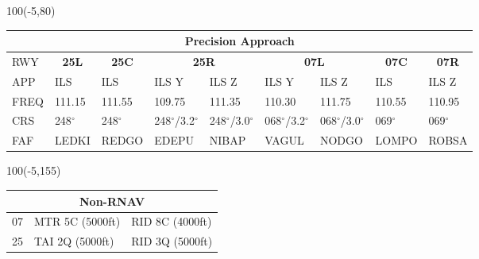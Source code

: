 \documentclass[10pt,landscape,a4paper]{article}
\begin{document}
\begin{textblock}{100}(-5,80)
\begin{table}[]
\begin{tabular}{|l|l|l|l|l|l|l|l|l|}
\multicolumn{9}{c}{\textbf{Precision Approach}}                                                                                                                                                                            \\ \hline
RWY  & \multicolumn{1}{c|}{\textbf{25L}} & \multicolumn{1}{c|}{\textbf{25C}} & \multicolumn{2}{c|}{\textbf{25R}} & \multicolumn{2}{c|}{\textbf{07L}} & \multicolumn{1}{c|}{\textbf{07C}} & \multicolumn{1}{c|}{\textbf{07R}} \\ \hline
APP  & ILS                               & ILS                               & ILS Y           & ILS Z           & ILS Y           & ILS Z           & ILS                               & ILS Z                             \\
FREQ & 111.15                            & 111.55                            & 109.75          & 111.35          & 110.30          & 111.75          & 110.55                            & 110.95                            \\
CRS  & 248$^\circ$                              & 248$^\circ$                              & 248$^\circ$/3.2$^\circ$       & 248$^\circ$/3.0$^\circ$       & 068$^\circ$/3.2$^\circ$       & 068$^\circ$/3.0$^\circ$       & 069$^\circ$                              & 069$^\circ$                              \\
FAF  & LEDKI                             & REDGO                             & EDEPU           & NIBAP           & VAGUL           & NODGO           & LOMPO                             & ROBSA                             \\ \hline
\end{tabular}
\end{table}
\end{textblock}



\begin{textblock}{100}(-5,155)
\begin{table}[]
\begin{tabular}{|l|l|l|}
\multicolumn{3}{c}{\textbf{Non-RNAV}} \\ \hline
07  & MTR 5C (5000ft)    & RID 8C (4000ft)   \\ \hline
25  & TAI 2Q (5000ft)    & RID 3Q (5000ft)   \\ \hline
\end{tabular}
\end{table}
\end{textblock}
\end{document}
